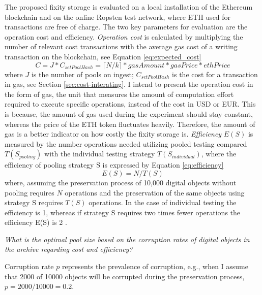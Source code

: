 The proposed fixity storage is evaluated on a local installation of the Ethereum blockchain and on the online Ropsten test network, where ETH used for transactions are free of charge.
The two key parameters for evaluation are the operation cost and efficiency. 
\textit{Operation cost} is calculated by multiplying the number of relevant cost transactions with the average gas cost of a writing transaction on the blockchain, see Equation \ref{eq:expected_cost}
\begin{equation}\label{eq:expected_cost}
    C = J * C_{setPoolHash} = \lceil N/k \rceil * gasAmount * gasPrice * ethPrice
\end{equation}
where $J$ is the number of pools on ingest; $C_{setPoolHash} $ is the cost for a transaction in gas, see Section \ref{sec:cost-interating}.
I intend to present the operation cost in the form of gas, the unit that measures the amount of computation effort required to execute specific operations, instead of the cost in USD or EUR. This is because, the amount of gas used during the experiment should stay constant, whereas the price of the ETH token fluctuates heavily. Therefore, the amount of gas is a better indicator on how costly the fixity storage is.
\textit{Efficiency} $E(S)$ is measured by the number operations needed utilizing pooled testing compared $T(S_{pooling})$ with the individual testing strategy $T(S_{individual})$, where the efficiency of pooling strategy S is expressed by Equation \ref{eq:efficiency}
\begin{equation}\label{eq:efficiency}
    E(S) = N/T(S)
\end{equation}
where, assuming the preservation process of 10,000 digital objects without pooling requires $N$ operations and the preservation of the same objects using strategy S requires $T(S)$ operations. In the case of individual testing the efficiency is 1, whereas if strategy S requires two times fewer operations the efficiency E(S) is 2 \cite[4]{vzilinskas2021pooled}.

\textit{What is the optimal pool size based on the corruption rates of digital objects in the archive regarding cost and efficiency?}

Corruption rate $p$ represents the prevalence of corruption, e.g., when I assume that 2000 of 10000 objects will be corrupted during the preservation process, $p = 2000/10000 = 0.2$. 

